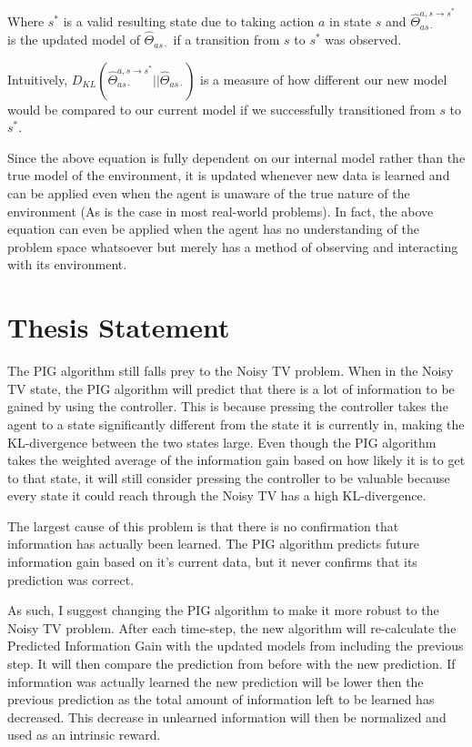 \documentclass[12pt]{thesis}
\begin{document}
Where $s^{*}$ is a valid resulting state due to taking action $a$ in state $s$ and $\hat{\Theta}_{as\cdot}^{a,s \rightarrow s^{*}}$ is the updated model of $\hat{\Theta}_{as\cdot}$ if a transition from $s$ to $s^{*}$ was observed.

Intuitively, $D_{KL}(\hat{\Theta}_{as\cdot}^{a,s \rightarrow s^{*}} || \hat{\Theta}_{as\cdot})$ is a measure of how different our new model would be compared to our current model if we successfully transitioned from $s$ to $s^{*}$.

Since the above equation is fully dependent on our internal model rather than the true model of the environment, it is updated whenever new data is learned and can be applied even when the agent is unaware of the true nature of the environment (As is the case in most real-world problems). In fact, the above equation can even be applied when the agent has no understanding of the problem space whatsoever but merely has a method of observing and interacting with its environment.

\section{Thesis Statement}
The PIG algorithm still falls prey to the Noisy TV problem. When in the Noisy TV state, the PIG algorithm will predict that there is a lot of information to be gained by using the controller. This is because pressing the controller takes the agent to a state significantly different from the state it is currently in, making the KL-divergence between the two states large. Even though the PIG algorithm takes the weighted average of the information gain based on how likely it is to get to that state, it will still consider pressing the controller to be valuable because every state it could reach through the Noisy TV has a high KL-divergence.

The largest cause of this problem is that there is no confirmation that information has actually been learned. The PIG algorithm predicts future information gain based on it’s current data, but it never confirms that its prediction was correct.

As such, I suggest changing the PIG algorithm to make it more robust to the Noisy TV problem. After each time-step, the new algorithm will re-calculate the Predicted Information Gain with the updated models from including the previous step. It will then compare the prediction from before with the new prediction. If information was actually learned the new prediction will be lower then the previous prediction as the total amount of information left to be learned has decreased. This decrease in unlearned information will then be normalized and used as an intrinsic reward.
\end{document}
